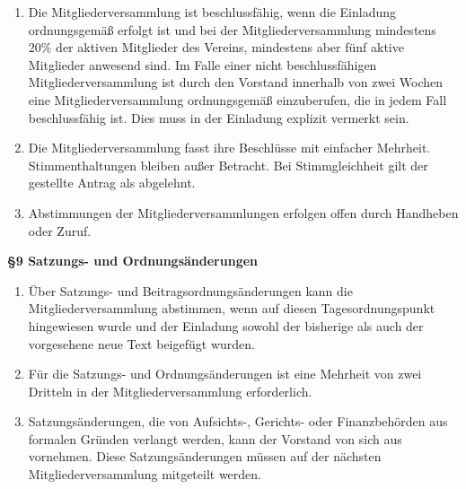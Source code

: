 \documentclass[a4paper,
               12pt,
               titlepage,
               parskip=half]{scrartcl}
\begin{document}
{\begin{enumerate}
		\item Die Mitgliederversammlung ist beschlussfähig, wenn die Einladung ordnungsgemäß erfolgt ist und bei der Mitgliederversammlung mindestens 20\% der aktiven Mitglieder des Vereins, mindestens aber fünf aktive Mitglieder anwesend sind. Im Falle einer nicht beschlussfähigen Mitgliederversammlung ist durch den Vorstand innerhalb von zwei Wochen eine Mitgliederversammlung ordnungsgemäß einzuberufen, die in jedem Fall beschlussfähig ist. Dies muss in der Einladung explizit vermerkt sein.
		\item Die Mitgliederversammlung fasst ihre Beschlüsse mit einfacher Mehrheit. Stimmenthaltungen bleiben außer Betracht. Bei Stimmgleichheit gilt der gestellte Antrag als abgelehnt.
		\item Abstimmungen der Mitgliederversammlungen erfolgen offen durch Handheben oder Zuruf.
	\end{enumerate}
}

\vspace{1.0em}

\textbf{§9 Satzungs- und Ordnungsänderungen}
{\small
	\begin{enumerate}
		\item Über Satzungs- und Beitragsordnungsänderungen kann die Mitgliederversammlung abstimmen, wenn auf diesen Tagesordnungspunkt hingewiesen wurde und der Einladung sowohl der bisherige als auch der vorgesehene neue Text beigefügt wurden.
		\item Für die Satzungs- und Ordnungsänderungen ist eine Mehrheit von zwei Dritteln in der Mitgliederversammlung erforderlich.
		\item Satzungsänderungen, die von Aufsichts-, Gerichts- oder Finanzbehörden aus formalen Gründen verlangt werden, kann der Vorstand von sich aus vornehmen. Diese Satzungsänderungen müssen auf der nächsten Mitgliederversammlung mitgeteilt werden.
	\end{enumerate}
}

\vspace{1.0em}
\end{document}
